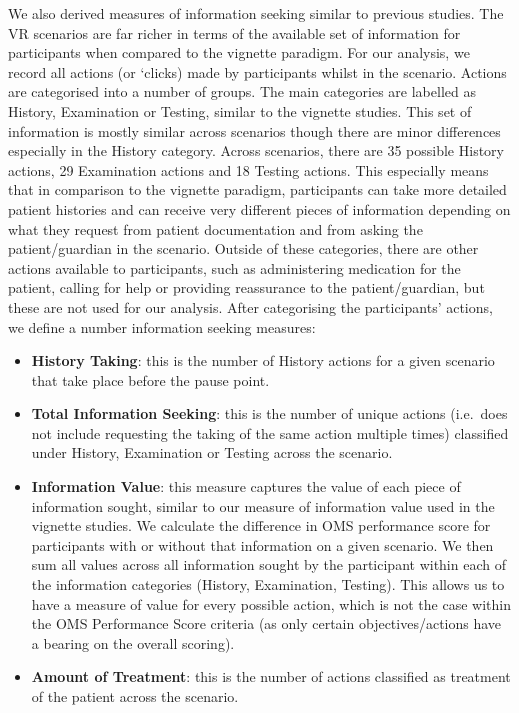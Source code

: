 \documentclass[a4paper, nobind]{templates/ociamthesis}
\providecommand{\tightlist}{%
  \setlength{\itemsep}{0pt}\setlength{\parskip}{0pt}}
\begin{document}
We also derived measures of information seeking similar to previous studies. The VR scenarios are far richer in terms of the available set of information for participants when compared to the vignette paradigm. For our analysis, we record all actions (or `clicks) made by participants whilst in the scenario. Actions are categorised into a number of groups. The main categories are labelled as History, Examination or Testing, similar to the vignette studies. This set of information is mostly similar across scenarios though there are minor differences especially in the History category. Across scenarios, there are 35 possible History actions, 29 Examination actions and 18 Testing actions. This especially means that in comparison to the vignette paradigm, participants can take more detailed patient histories and can receive very different pieces of information depending on what they request from patient documentation and from asking the patient/guardian in the scenario. Outside of these categories, there are other actions available to participants, such as administering medication for the patient, calling for help or providing reassurance to the patient/guardian, but these are not used for our analysis. After categorising the participants' actions, we define a number information seeking measures:

\begin{itemize}
\tightlist
\item
  \textbf{History Taking}: this is the number of History actions for a given scenario that take place before the pause point.
\item
  \textbf{Total Information Seeking}: this is the number of unique actions (i.e.~does not include requesting the taking of the same action multiple times) classified under History, Examination or Testing across the scenario.
\item
  \textbf{Information Value}: this measure captures the value of each piece of information sought, similar to our measure of information value used in the vignette studies. We calculate the difference in OMS performance score for participants with or without that information on a given scenario. We then sum all values across all information sought by the participant within each of the information categories (History, Examination, Testing). This allows us to have a measure of value for every possible action, which is not the case within the OMS Performance Score criteria (as only certain objectives/actions have a bearing on the overall scoring).
\item
  \textbf{Amount of Treatment}: this is the number of actions classified as treatment of the patient across the scenario.
\end{itemize}
\end{document}
